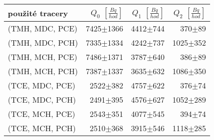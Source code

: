 \begin{tabular}{lrrr}
\toprule
použité tracery & $Q_0$ $\left[\si{\frac{Bq}{hod}}\right]$ & $Q_1$ $\left[\si{\frac{Bq}{hod}}\right]$ & $Q_2$ $\left[\si{\frac{Bq}{hod}}\right]$ \\
\midrule
(TMH, MDC, PCE) &7425$\pm$1366 &4412$\pm$744 &   370$\pm$89 \\
(TMH, MDC, PCH) &7335$\pm$1334 &4242$\pm$737 & 1025$\pm$352 \\
(TMH, MCH, PCE) &7486$\pm$1371 &3787$\pm$640 &   386$\pm$89 \\
(TMH, MCH, PCH) &7387$\pm$1337 &3635$\pm$632 & 1086$\pm$350 \\
(TCE, MDC, PCE) & 2522$\pm$382 &4757$\pm$622 &   376$\pm$74 \\
(TCE, MDC, PCH) & 2491$\pm$395 &4576$\pm$627 & 1052$\pm$289 \\
(TCE, MCH, PCE) & 2543$\pm$351 &4077$\pm$545 &   394$\pm$74 \\
(TCE, MCH, PCH) & 2510$\pm$368 &3915$\pm$546 & 1118$\pm$285 \\
\bottomrule
\end{tabular}
